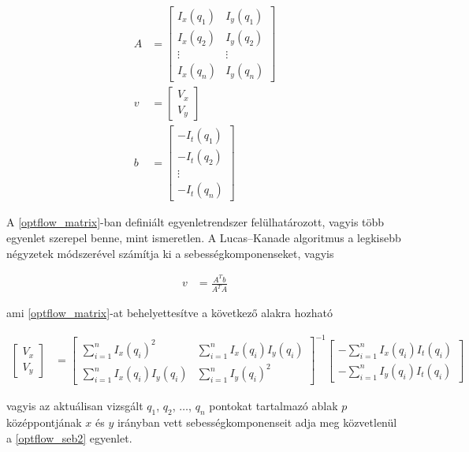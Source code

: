 \begin{align}\label{eq:optflow_matrix}
A &= \left[ \begin{array}{cc} I_x(q_1) & I_y(q_1) \\ I_x(q_2) & I_y(q_2) \\ \vdots & \vdots \\ I_x(q_n) & I_y(q_n) \end{array} \right] \nonumber \\
v &= \left[ \begin{array}{c} V_x \\ V_y \end{array} \right] \nonumber \\
b &= \left[ \begin{array}{c} -I_t(q_1) \\ -I_t(q_2) \\ \vdots \\ -I_t(q_n) \end{array} \right]
\end{align}

A \eqref{optflow_matrix}-ban definiált egyenletrendszer felülhatározott, vagyis több egyenlet szerepel benne, mint ismeretlen. A Lucas--Kanade algoritmus a legkisebb négyzetek módszerével számítja ki a sebességkomponenseket, vagyis

\begin{align}\label{eq:optflow_seb1}
v &= \frac{A^T b}{A^T A}
\end{align}

ami \eqref{optflow_matrix}-at behelyettesítve a következő alakra hozható

\begin{align}\label{eq:optflow_seb2}
\left[ \begin{array}{c} V_x \\ V_y \end{array} \right] &= \left[ \begin{array}{cc} \sum_{i=1}^n I_x(q_i)^2 & \sum_{i=1}^n I_x(q_i)I_y(q_i) \\ \sum_{i=1}^n I_x(q_i)I_y(q_i) & \sum_{i=1}^n I_y(q_i)^2 \end{array} \right]^{-1} \left[ \begin{array}{c} - \sum_{i=1}^n I_x(q_i)I_t(q_i) \\ - \sum_{i=1}^n I_y(q_i)I_t(q_i) \end{array} \right]
\end{align}

vagyis az aktuálisan vizsgált $q_1$, $q_2$, $\ldots$, $q_n$ pontokat tartalmazó ablak $p$ középpontjának $x$ és $y$ irányban vett sebességkomponenseit adja meg közvetlenül a \eqref{optflow_seb2} egyenlet.

